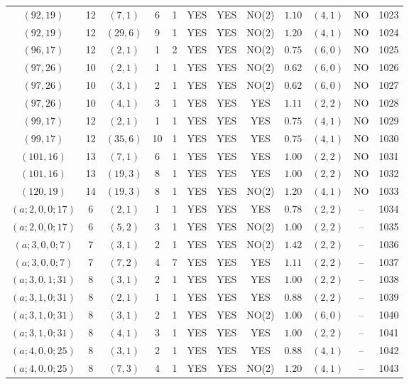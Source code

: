 \begin{longtable}{|c|c|c|c|c|c|c|c|c|c|c|c|}
$(92,19)$ & 12 & $(7,1)$ & 6 & 1 & YES & YES & NO(2) & $1.10$ & $(4,1)$ & NO & 1023\\
$(92,19)$ & 12 & $(29,6)$ & 9 & 1 & YES & YES & NO(2) & $1.20$ & $(4,1)$ & NO & 1024\\
$(96,17)$ & 12 & $(2,1)$ & 1 & 2 & YES & YES & NO(2) & $0.75$ & $(6,0)$ & NO & 1025\\
$(97,26)$ & 10 & $(2,1)$ & 1 & 1 & YES & YES & NO(2) & $0.62$ & $(6,0)$ & NO & 1026\\
$(97,26)$ & 10 & $(3,1)$ & 2 & 1 & YES & YES & NO(2) & $0.62$ & $(6,0)$ & NO & 1027\\
$(97,26)$ & 10 & $(4,1)$ & 3 & 1 & YES & YES & YES & $1.11$ & $(2,2)$ & NO & 1028\\
$(99,17)$ & 12 & $(2,1)$ & 1 & 1 & YES & YES & YES & $0.75$ & $(4,1)$ & NO & 1029\\
$(99,17)$ & 12 & $(35,6)$ & 10 & 1 & YES & YES & YES & $0.75$ & $(4,1)$ & NO & 1030\\
$(101,16)$ & 13 & $(7,1)$ & 6 & 1 & YES & YES & YES & $1.00$ & $(2,2)$ & NO & 1031\\
$(101,16)$ & 13 & $(19,3)$ & 8 & 1 & YES & YES & YES & $1.00$ & $(2,2)$ & NO & 1032\\
$(120,19)$ & 14 & $(19,3)$ & 8 & 1 & YES & YES & NO(2) & $1.20$ & $(4,1)$ & NO & 1033\\
$(a;2,0,0;17)$ & 6 & $(2,1)$ & 1 & 1 & YES & YES & YES & $0.78$ & $(2,2)$ & -- & 1034\\
$(a;2,0,0;17)$ & 6 & $(5,2)$ & 3 & 1 & YES & YES & NO(2) & $1.00$ & $(2,2)$ & -- & 1035\\
$(a;3,0,0;7)$ & 7 & $(3,1)$ & 2 & 1 & YES & YES & NO(2) & $1.42$ & $(2,2)$ & -- & 1036\\
$(a;3,0,0;7)$ & 7 & $(7,2)$ & 4 & 7 & YES & YES & YES & $1.11$ & $(2,2)$ & -- & 1037\\
$(a;3,0,1;31)$ & 8 & $(3,1)$ & 2 & 1 & YES & YES & YES & $1.00$ & $(2,2)$ & -- & 1038\\
$(a;3,1,0;31)$ & 8 & $(2,1)$ & 1 & 1 & YES & YES & YES & $0.88$ & $(2,2)$ & -- & 1039\\
$(a;3,1,0;31)$ & 8 & $(3,1)$ & 2 & 1 & YES & YES & NO(2) & $1.00$ & $(6,0)$ & -- & 1040\\
$(a;3,1,0;31)$ & 8 & $(4,1)$ & 3 & 1 & YES & YES & YES & $1.00$ & $(2,2)$ & -- & 1041\\
$(a;4,0,0;25)$ & 8 & $(3,1)$ & 2 & 1 & YES & YES & YES & $0.88$ & $(4,1)$ & -- & 1042\\
$(a;4,0,0;25)$ & 8 & $(7,3)$ & 4 & 1 & YES & YES & NO(2) & $1.20$ & $(4,1)$ & -- & 1043\\

\end{longtable}
